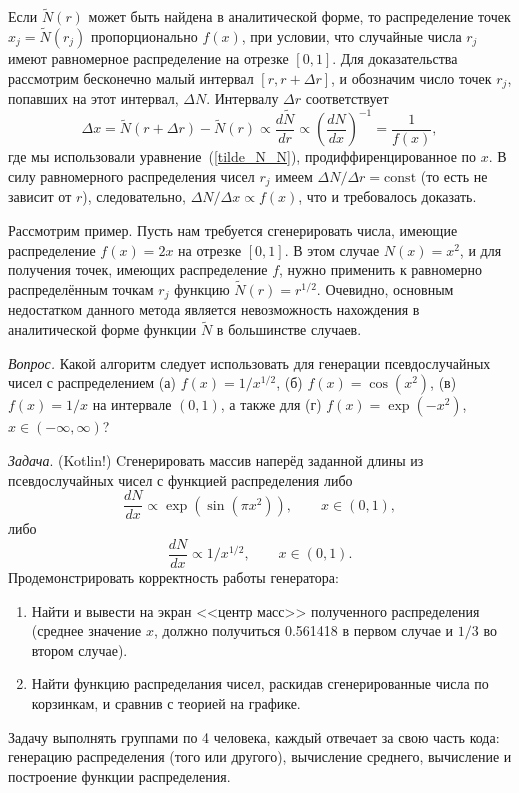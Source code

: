 \documentclass{book}
\begin{document}
Если $\tilde N(r)$ может быть найдена в аналитической форме, то распределение точек $x_j = \tilde
N(r_j)$ пропорционально $f(x)$, при условии, что случайные числа $r_j$ имеют равномерное
распределение на отрезке $[0, 1]$. Для доказательства рассмотрим бесконечно малый интервал $[r, r +
\Delta r]$, и обозначим число точек $r_j$, попавших на этот интервал, $\Delta N$.
Интервалу $\Delta r$ соответствует
\begin{equation}
    \Delta x = \tilde N(r + \Delta r) - \tilde N(r) \propto \frac{d \tilde N}{dr} \propto \left(
    \frac{dN}{dx} \right)^{-1} = \frac{1}{f(x)},
\end{equation}
где мы использовали уравнение~(\ref{tilde_N_N}), продиффиренцированное по $x$.
В силу равномерного распределения чисел $r_j$ имеем $\Delta N /
\Delta r = \mathrm{const}$ (то есть не зависит от $r$), следовательно, $\Delta N / \Delta x \propto f(x)$, что и требовалось
доказать.

Рассмотрим пример. Пусть нам требуется сгенерировать числа, имеющие распределение $f(x) = 2 x$ на
отрезке $[0, 1]$. В этом случае $N(x) = x^2$, и для получения точек, имеющих распределение $f$,
нужно применить к равномерно распределённым точкам $r_j$ функцию $\tilde N(r) = r^{1/2}$. Очевидно,
основным недостатком данного метода является невозможность нахождения в аналитической форме функции
$\tilde N$ в большинстве случаев.

\textit{Вопрос.} Какой алгоритм следует использовать для генерации псевдослучайных чисел с
распределением (а) $f(x) = 1 / x^{1/2}$, (б) $f(x) = \cos (x^2)$, (в) $f(x) = 1 / x$  на интервале
$(0, 1)$, а также для (г) $f(x) = \exp(-x^2)$, $x \in (-\infty, \infty)$?

\textit{Задача}. (Kotlin!) Cгенерировать массив наперёд заданной длины из псевдослучайных чисел с
функцией распределения либо
\begin{equation}
    \frac{dN}{dx} \propto \exp(\sin(\pi x^2)), \qquad x \in (0, 1),
\end{equation}
либо
\begin{equation}
    \frac{dN}{dx} \propto 1 / x^{1/2}, \qquad x \in (0, 1).
\end{equation}
Продемонстрировать корректность работы генератора:
\begin{enumerate}
  \item Найти и вывести на экран <<центр масс>> полученного распределения (среднее значение $x$,
      должно получиться 0.561418 в первом случае и $1/3$ во втором случае).
  \item Найти функцию распределания чисел, раскидав сгенерированные числа по
      корзинкам, и сравнив с теорией на графике.
\end{enumerate}
Задачу выполнять группами по 4 человека, каждый отвечает за свою часть кода: генерацию
распределения (того или другого), вычисление среднего, вычисление и построение функции
распределения.
\end{document}

